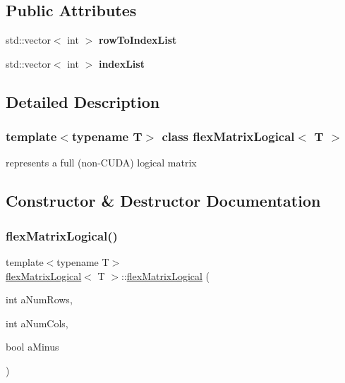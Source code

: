\subsection*{Public Attributes}
\begin{DoxyCompactItemize}
\item 
\mbox{\label{classflex_matrix_logical_ae7b012bd8935f92c9e266f4a6d7ea91c}} 
std\+::vector$<$ int $>$ {\bfseries row\+To\+Index\+List}
\item 
\mbox{\label{classflex_matrix_logical_aa8279c96a0b4f8f80db84b92faa763df}} 
std\+::vector$<$ int $>$ {\bfseries index\+List}
\end{DoxyCompactItemize}


\subsection{Detailed Description}
\subsubsection*{template$<$typename T$>$\newline
class flex\+Matrix\+Logical$<$ T $>$}

represents a full (non-\/\+C\+U\+DA) logical matrix 

\subsection{Constructor \& Destructor Documentation}
\mbox{\label{classflex_matrix_logical_abbd2d5d1be94e9d98167e82b6f0395be}} 
\subsubsection{\texorpdfstring{flex\+Matrix\+Logical()}{flexMatrixLogical()}}
{\footnotesize\ttfamily template$<$typename T$>$ \\
\hyperlink{classflex_matrix_logical}{flex\+Matrix\+Logical}$<$ T $>$\+::\hyperlink{classflex_matrix_logical}{flex\+Matrix\+Logical} (\begin{DoxyParamCaption}\item[{int}]{a\+Num\+Rows,  }\item[{int}]{a\+Num\+Cols,  }\item[{bool}]{a\+Minus }\end{DoxyParamCaption})\hspace{0.3cm}{\ttfamily [inline]}}



